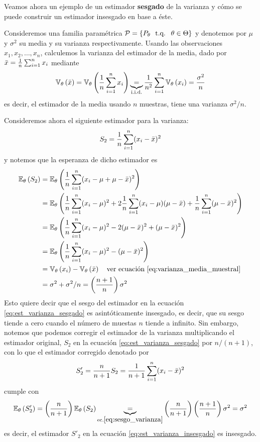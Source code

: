Veamos ahora un ejemplo de un estimador \textbf{sesgado} de la varianza y cómo se puede construir un estimador insesgado en base a éste. 

\begin{example}
Consideremos una familia paramétrica $\mathcal{P} = \{P_\theta\ {\text{ t.q. }}\ \theta\in\Theta\}$ y denotemos por $\mu$ y $\sigma^2$ su media y su varianza respectivamente. Usando las observaciones $x_1,x_2,\ldots,x_n$, calculemos la varianza del estimador de la media, dado por ${ \bar{x}} = \frac{1}{n}\sum_{i=1}^n x_i$ mediante
\begin{equation}
	\label{eq:varianza_media_muestral}
 	\mathbb{V}_\theta \left({ \bar{x}}\right) = \mathbb{V}_\theta \left(\frac{1}{n}	\sum_{i=1}^n x_i\right)  \underbrace{=}_{\text{i.i.d.}}  \frac{1}{n^2}	\sum_{i=1}^n\mathbb{V}_\theta \left( x_i\right) =\frac{\sigma^2}{n}
 \end{equation} 
 es decir, el estimador de la media usando $n$ muestras, tiene una varianza $\sigma^2/n$.

 Consideremos ahora el siguiente estimador para la varianza: 
\begin{equation}
	\label{eq:est_varianza_sesgado}
	S_2 = \frac{1}{n}\sum_{i=1}^n (x_i-{ \bar{x}})^2
\end{equation}
y notemos que la esperanza de dicho estimador es
\begin{align}
	\label{eq:sesgo_varianza}
	\mathbb{E}_\theta \left(S_2 \right) &= \mathbb{E}_\theta \left(\frac{1}{n}\sum_{i=1}^n (x_i-\mu+\mu-{ \bar{x}})^2\right)\nonumber\\
				&= \mathbb{E}_\theta \left( \frac{1}{n}\sum_{i=1}^n(x_i-\mu)^2 + 2\frac{1}{n}\sum_{i=1}^n(x_i-\mu)(\mu-{ \bar{x}}) + \frac{1}{n}\sum_{i=1}^n(\mu-{ \bar{x}})^2\right)\nonumber\\
				&= \mathbb{E}_\theta \left( \frac{1}{n}\sum_{i=1}^n(x_i-\mu)^2 - 2(\mu-{ \bar{x}})^2 + (\mu-{ \bar{x}})^2\right)\nonumber\\
				&= \mathbb{E}_\theta \left( \frac{1}{n}\sum_{i=1}^n(x_i-\mu)^2 - (\mu-{ \bar{x}})^2\right)\nonumber\\
				&= \mathbb{V}_\theta \left(x_i\right) - \mathbb{V}_\theta \left({ \bar{x}}\right)\quad\text{ver ecuación \eqref{eq:varianza_media_muestral}}\nonumber\\
				&= 	\sigma^2 + \sigma^2/n = \left(\frac{n+1}{n}\right)\sigma^2
\end{align}
Esto quiere decir que el sesgo del estimador en la ecuación \eqref{eq:est_varianza_sesgado} es asintóticamente insesgado, es decir, que su sesgo tiende a cero cuando el número de muestas $n$ tiende a infinito. Sin embargo, notemos que podemos corregir el estimador de la varianza multiplicando el estimador original, $S_2$ en la ecuación \eqref{eq:est_varianza_sesgado} por $n/(n+1)$, con lo que el estimador corregido denotado por 
\begin{equation}
	\label{eq:est_varianza_insesgado}
	S'_2 = \frac{n}{n+1}S_2 =  \frac{1}{n+1}\sum_{i=1}^n (x_i-{ \bar{x}})^2
\end{equation}
cumple con
\begin{equation}
	\mathbb{E}_\theta \left(S'_2 \right) =  \left(\frac{n}{n+1}\right)\mathbb{E}_\theta \left(S_2\right) \underbrace{=}_{\text{ec.}\eqref{eq:sesgo_varianza}} \left(\frac{n}{n+1}\right) \left(\frac{n+1}{n}\right)\sigma^2 = \sigma^2
\end{equation}
es decir, el estimador $S'_2$ en la ecuación \eqref{eq:est_varianza_insesgado} es insesgado.
\end{example}

